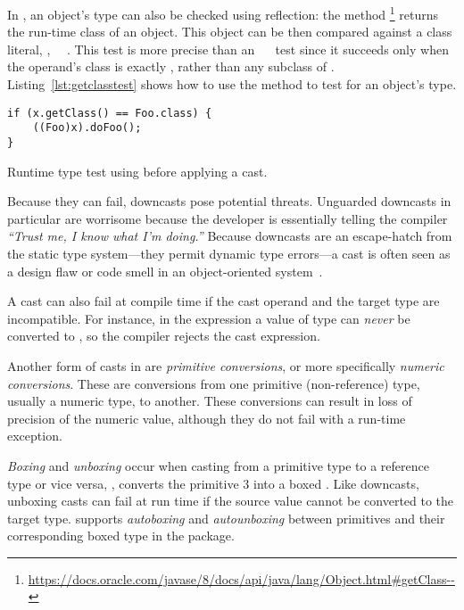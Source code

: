In \java{}, an object's type can also be checked using reflection:
the  method%
\footnote{\url{https://docs.oracle.com/javase/8/docs/api/java/lang/Object.html\#getClass--}}
returns the run-time class of an object.
This  object can be then compared against a class literal, \eg,
~\code{==}~.
This test is more precise than an ~~ test since it succeeds only when the operand's class is exactly ,
rather than any subclass of .
Listing~\ref{lst:getclasstest} shows how to use the  method to test for an object's type.

\begin{listing}[H]
\begin{verbatim}
if (x.getClass() == Foo.class) {
	((Foo)x).doFoo(); 
}
\end{verbatim}
\caption{Runtime type test using  before applying a cast.}
\label{lst:getclasstest}
\end{listing}

Because they can fail,
downcasts pose potential threats.
Unguarded downcasts in particular are
worrisome because the developer is essentially telling the compiler
\emph{``Trust me, I know what I'm doing.''}
Because downcasts are an escape-hatch from the static type system---they
permit dynamic type errors---a cast is often seen as a design flaw or code
smell in an object-oriented system~\citep{tufanoWhenWhyYour2015}.

A cast can also fail at compile time if the cast operand and the target type are incompatible.
For instance, in the expression  a value of type
 can \emph{never} be converted to , so the compiler
rejects the cast expression.

Another form of casts in \java{} are \emph{primitive conversions}, or more specifically
\emph{numeric conversions}. These are conversions from
one primitive (non-reference) type, usually a numeric type, to another. These conversions can result
in loss of precision of the numeric value, although they do not fail with a
run-time exception.

\emph{Boxing} and \emph{unboxing} occur when casting from a primitive type to
a reference type or vice versa, \eg,  converts the primitive
 3 into a boxed .
Like downcasts, unboxing casts can fail at
run time if the source value cannot be converted to the target type.
\java{} supports \emph{autoboxing} and \emph{autounboxing} between primitives and their corresponding
boxed type in the  package.

